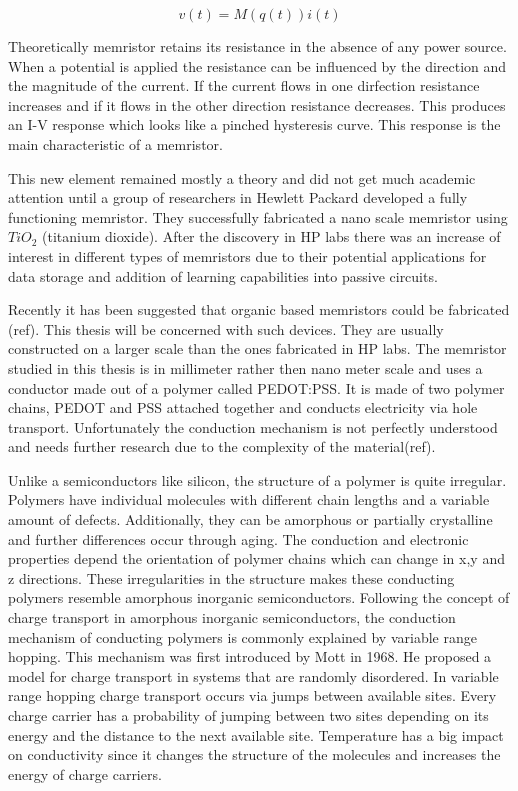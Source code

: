 
\begin{equation}
v(t)=M(q(t))i(t)
\end{equation}

Theoretically memristor retains its resistance in the absence of any power source. When a potential is applied the resistance can be influenced by the direction and the magnitude of the current. If the current flows in one dirfection resistance increases and if it flows in the other direction resistance decreases. This produces an I-V response which looks like a pinched hysteresis curve. This response is the main characteristic of a memristor. 

This new element remained mostly a theory and did not get much academic attention until a group of researchers in Hewlett Packard developed a fully functioning memristor. They successfully fabricated a nano scale memristor using $TiO_2$ (titanium dioxide). After the discovery in HP labs there was an increase of interest in different types of memristors due to their potential applications for data storage and addition of learning capabilities into passive circuits. 

Recently it has been suggested that organic based memristors could be fabricated (ref). This thesis will be concerned with such devices. They are usually constructed on a larger scale than the ones fabricated in HP labs. The memristor studied in this thesis is in millimeter rather then nano meter scale and uses a conductor made out of a polymer called PEDOT:PSS. It is made of two polymer chains, PEDOT and PSS attached together and conducts electricity via hole transport. Unfortunately the conduction mechanism is not perfectly understood and needs further research due to the complexity of the material(ref).

Unlike a semiconductors like silicon, the structure of a polymer is quite irregular. Polymers have individual molecules with different chain lengths and a variable amount of defects.
Additionally, they can be amorphous or partially crystalline and further differences occur through aging. The conduction and electronic properties depend the orientation of polymer chains which can change in x,y and z directions. These irregularities in the structure makes these conducting polymers resemble amorphous inorganic semiconductors. Following the concept of charge transport in amorphous inorganic semiconductors, the conduction mechanism of conducting polymers is commonly explained by variable range hopping. This mechanism was first introduced by Mott in 1968. He proposed a model for charge transport in systems that are randomly disordered. In variable range hopping charge transport occurs via jumps between available sites. Every charge carrier has a probability of jumping between two sites depending on its energy and the distance to the next available site. Temperature has a big impact on conductivity since it changes the structure of the molecules and increases the energy of charge carriers.

